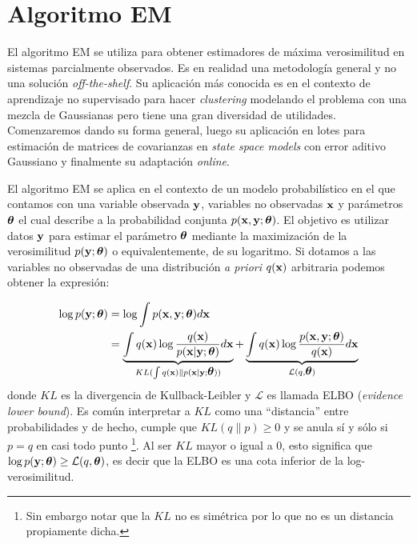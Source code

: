 
\section{Algoritmo EM}

El algoritmo EM se utiliza para obtener estimadores de máxima verosimilitud en sistemas parcialmente observados. Es en realidad una metodología general y no una solución \textit{off-the-shelf}. Su aplicación más conocida es en el contexto de aprendizaje no supervisado para hacer \textit{clustering} modelando el problema con una mezcla de Gaussianas \citep{Bishop2006} pero tiene una gran diversidad de utilidades. Comenzaremos dando su forma general, luego su aplicación en lotes para estimación de matrices de covarianzas en \textit{state space models} con error aditivo Gaussiano y finalmente su adaptación \textit{online}.

El algoritmo EM se aplica en el contexto de un modelo probabilístico en el que contamos con una variable observada $\mathbf{y}$, variables no observadas $\mathbf{x}$ y parámetros $\mbox{\boldmath$ \theta $}$ el cual describe a la probabilidad conjunta $p(\mathbf{x},  \mathbf{y}; \mbox{\boldmath$ \theta $})$. El objetivo es utilizar datos $\mathbf{y}$ para estimar el parámetro $\mbox{\boldmath$ \theta $}$ mediante la maximización de la verosimilitud $p(\mathbf{y}; \mbox{\boldmath$ \theta $})$ o equivalentemente, de su logaritmo. Si dotamos a las variables no observadas de una distribución \textit{a priori} $q(\mathbf{x})$ arbitraria podemos obtener la expresión:

\begin{align}
    \log p(\mathbf{y}; \mbox{\boldmath$ \theta $}) &=  \log \int p(\mathbf{x}, \mathbf{y}; \mbox{\boldmath$ \theta $}) d\mathbf{x} \\
    &=  \underbrace{\int q(\mathbf{x}) \log \frac{q(\mathbf{x})}{p(\mathbf{x} | \mathbf{y}; \mbox{\boldmath$ \theta $})} d\mathbf{x}}_{KL(\int q(\mathbf{x}) \rVert p(\mathbf{x} | \mathbf{y}; \mbox{\boldmath$ \theta $}))} + \underbrace{\int q(\mathbf{x}) \log \frac{p(\mathbf{x}, \mathbf{y}; \mbox{\boldmath$ \theta $})}{q(\mathbf{x})} d\mathbf{x}}_{\mathcal{L}(q, \mbox{\boldmath$ \theta $})} \label{eq:elbo_KL}
\end{align}
donde $KL$ es la divergencia de Kullback-Leibler y $\mathcal{L}$ es llamada ELBO (\textit{evidence lower bound}). Es común interpretar a $KL$ como una ``distancia'' entre probabilidades y de hecho, cumple que $KL(q \rVert p) \geq 0$ y se anula sí y sólo si $p = q$ en casi todo punto \footnote{Sin embargo notar que la $KL$ no es simétrica por lo que no es un distancia propiamente dicha.}. Al ser $KL$ mayor o igual a 0, esto significa que $\log p(\mathbf{y}; \mbox{\boldmath$ \theta $}) \geq \mathcal{L}(q, \mbox{\boldmath$ \theta $})$, es decir que la ELBO es una cota inferior de la log-verosimilitud.  

